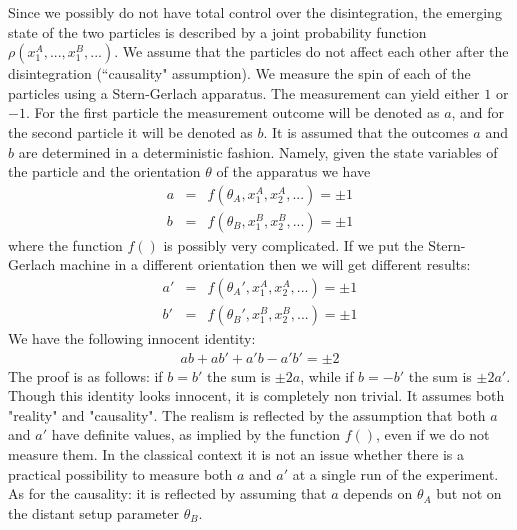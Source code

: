 \documentclass[onecolumn,fleqn]{revtex4}
\newcommand{\beq}{\begin{eqnarray}}
\newcommand{\eeq}{\end{eqnarray}}
\begin{document}
Since we possibly do not have total control over the
disintegration, the emerging state of the two particles 
is described  by a joint probability function 
$\rho\left(x^A_1,...,x^B_1,...\right)$.
We assume that the particles do not affect each other  
after the disintegration (``causality" assumption).
We measure the spin of each of the particles using
a Stern-Gerlach apparatus. The measurement can yield
either $1$ or $-1$. For the first particle the measurement 
outcome will be denoted as $a$, and for the second particle 
it will be denoted as $b$.  It is assumed that 
the outcomes $a$ and $b$ are determined in a deterministic 
fashion. Namely, given the state variables of the particle 
and the orientation $\theta$ of the apparatus we have 
\beq
a &=&  f(\theta_A, x^A_1, x^A_2, ... ) = \pm1 
\\ \nonumber
b &=&  f(\theta_B, x^B_1, x^B_2, ... ) = \pm1
\eeq
where the function $f()$ is possibly very complicated. 
If we put the Stern-Gerlach machine in a different orientation 
then we will get different results:
\beq
a' &=&   f\left(\theta_A', x^A_1, x^A_2, ...  \right)=\pm1 
\\ \nonumber
b' &=&   f\left(\theta_B', x^B_1, x^B_2, ...  \right)=\pm1
\eeq
We have the following innocent identity:
\beq
ab+ab'+a'b-a'b' = \pm 2
\eeq
The proof is as follows: if $b=b'$ the sum is $\pm 2a$, 
while if $b=-b'$ the sum is $\pm 2a'$. 
Though this identity looks innocent, it is completely 
non trivial. It assumes both "reality" and "causality".
The realism is reflected by the assumption 
that both $a$ and $a'$ have definite values, 
as implied by the function $f()$, 
even if we do not measure them. 
In the classical context it is not an issue 
whether there is a practical possibility 
to measure both $a$ and $a'$ at a single run 
of the experiment.
As for the causality: it is reflected by assuming 
that $a$ depends on $\theta_A$ but not 
on the distant setup parameter $\theta_B$.   
\end{document}
